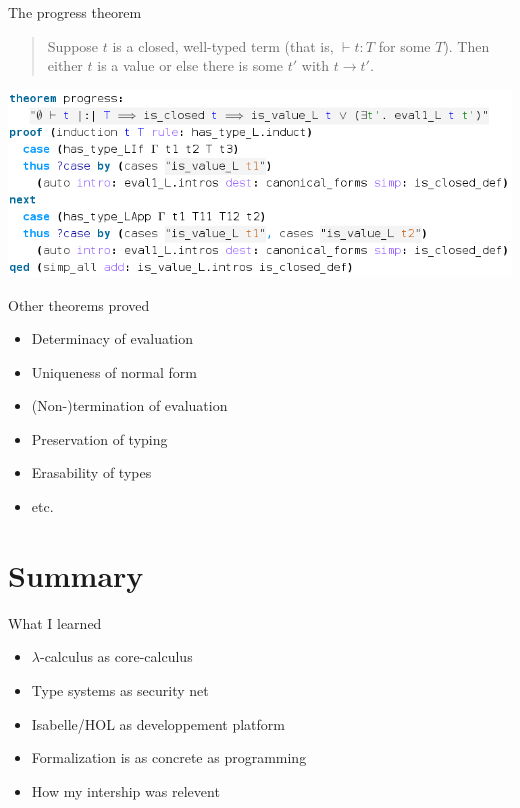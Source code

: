 \documentclass[xcolor=dvipsnames,notes]{beamer}
\begin{document}
\begin{frame}{The progress theorem}
  \begin{center}
    \small
    \begin{quotation}
      \noindent Suppose $t$ is a closed, well-typed term (that is, $\vdash t : T$ for some
      $T$). Then either $t$ is a value or else there is some $t'$ with $t \to t'$.
    \end{quotation}
    \vspace{20pt}
    \includegraphics[scale=0.4]{progress.png}
  \end{center}
\end{frame}

\begin{frame}{Other theorems proved}
  \begin{itemize}
    \item Determinacy of evaluation
    \item Uniqueness of normal form
    \item (Non-)termination of evaluation
    \item Preservation of typing
    \item Erasability of types
    \item etc.
  \end{itemize}
\end{frame}

\section*{Summary}

\begin{frame}{What I learned}
  \begin{itemize}
    \item $\lambda$-calculus as core-calculus
    \item Type systems as security net
    \item Isabelle/HOL as developpement platform
    \item Formalization is as concrete as programming
    \item How my intership was relevent
  \end{itemize}
\end{frame}
\end{document}
